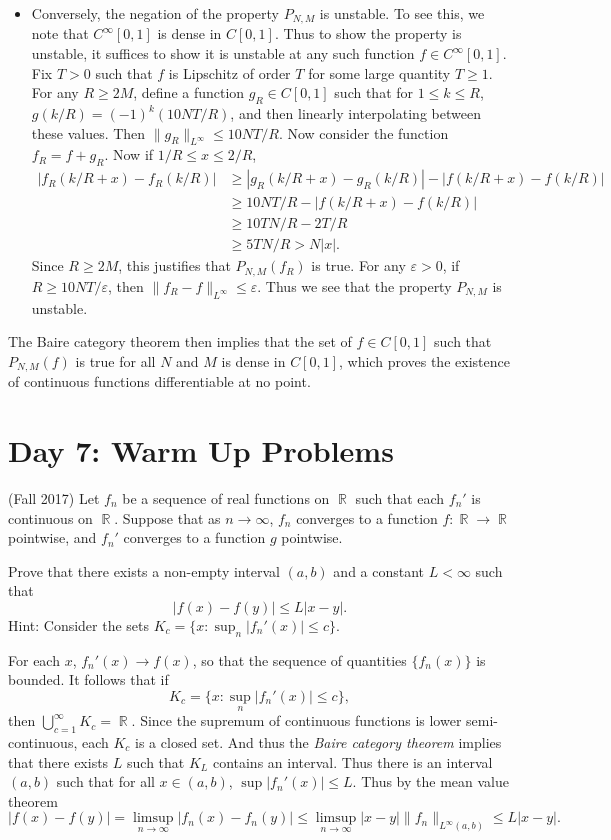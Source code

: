 \documentclass[answers]{exam}
\DeclareMathOperator{\RR}{\mathbb{R}}
\theoremstyle{problemstyle}
\newcommand{\1}[1]{\textbf{1}_{\left[#1\right]}} %
\begin{document}
\begin{questions}
\begin{itemize}
	\item Conversely, the negation of the property $P_{N,M}$ is unstable. To see this, we note that $C^\infty[0,1]$ is dense in $C[0,1]$. Thus to show the property is unstable, it suffices to show it is unstable at any such function $f \in C^\infty[0,1]$. Fix $T > 0$ such that $f$ is Lipschitz of order $T$ for some large quantity $T \geq 1$. For any $R \geq 2M$, define a function $g_R \in C[0,1]$ such that for $1 \leq k \leq R$, $g(k/R) = (-1)^k (10NT/R)$, and then linearly interpolating between these values. Then $\| g_R \|_{L^\infty} \leq 10NT/R$. Now consider the function $f_R = f + g_R$. Now if $1/R \leq x \leq 2/R$,
	\begin{align*}
		|f_R(k/R + x) - f_R(k/R)| &\geq |g_R(k/R + x) - g_R(k/R)| - |f(k/R + x) - f(k/R)|\\
		&\geq 10NT/R - |f(k/R + x) - f(k/R)|\\
		&\geq 10TN/R - 2T/R\\
		&\geq 5TN/R > N|x|.
	\end{align*}
	Since $R \geq 2M$, this justifies that $P_{N,M}(f_R)$ is true. For any $\varepsilon > 0$, if $R \geq 10NT/\varepsilon$, then $\| f_R - f \|_{L^\infty} \leq \varepsilon$. Thus we see that the property $P_{N,M}$ is unstable.
\end{itemize}
%
The Baire category theorem then implies that the set of $f \in C[0,1]$ such that $P_{N,M}(f)$ is true for all $N$ and $M$ is dense in $C[0,1]$, which proves the existence of continuous functions differentiable at no point.




\newpage
\section*{Day 7: Warm Up Problems}

\question (Fall 2017) Let $f_n$ be a sequence of real functions on $\RR$ such that each $f_n'$ is continuous on $\RR$. Suppose that as $n \to \infty$, $f_n$ converges to a function $f: \RR \to \RR$ pointwise, and $f_n'$ converges to a function $g$ pointwise.

Prove that there exists a non-empty interval $(a,b)$ and a constant $L < \infty$ such that
%
\[ |f(x) - f(y)| \leq L |x-y|. \]
%
Hint: Consider the sets $K_c = \{ x: \sup_n |f_n'(x)| \leq c \}$.
\begin{solution}
    For each $x$, $f_n'(x) \to f(x)$, so that the sequence of quantities $\{ f_n(x) \}$ is bounded. It follows that if
    \[ K_c = \{ x : \sup_n |f_n'(x)| \leq c \}, \]
    then $\bigcup_{c = 1}^\infty K_c = \RR$. Since the supremum of continuous functions is lower semi-continuous, each $K_c$ is a closed set. And thus the \emph{Baire category theorem} implies that there exists $L$ such that $K_L$ contains an interval. Thus there is an interval $(a,b)$ such that for all $x \in (a,b)$, $\sup |f_n'(x)| \leq L$. Thus by the mean value theorem
    \[ |f(x) - f(y)| = \limsup_{n \to \infty} |f_n(x) - f_n(y)| \leq \limsup_{n \to \infty} |x - y| \| f_n \|_{L^\infty(a,b)} \leq L |x - y|. \]
\end{solution}





\end{questions}
\end{document}
